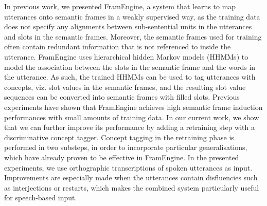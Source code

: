 \documentclass[10pt, a4paper, twopage, headinclude, footinclude, BCOR5mm]{book}
\begin{document}
\begin{table}[t!]
\end{table} 
\noindent
In previous work, we presented FramEngine, a system that learns to map utterances onto semantic frames in a weakly supervised way, as the training data does not specify any alignments between sub-sentential units in the utterances and slots in the semantic frames. Moreover, the semantic frames used for training often contain redundant information that is not referenced to inside the utterance. FramEngine uses hierarchical hidden Markov models (HHMMs) to model the association between the slots in the semantic frame and the words in the utterance. As such, the trained HHMMs can be used to tag utterances with concepts, viz. slot values in the semantic frames, and the resulting slot value sequences can be converted into semantic frames with filled slots.  Previous experiments have shown that FramEngine achieves high semantic frame induction performances with small amounts of training data. In our current work, we show that we can further improve its performance by adding a retraining step with a discriminative concept tagger. Concept tagging in the retraining phase is performed in two substeps, in order to incorporate particular generalisations, which have already proven to be effective in FramEngine. In the presented experiments, we use orthographic transcriptions of spoken utterances as input. Improvements are especially made when the utterances contain disfluencies such as interjections or restarts, which makes the combined system particularly useful for speech-based input.   
\end{document}
